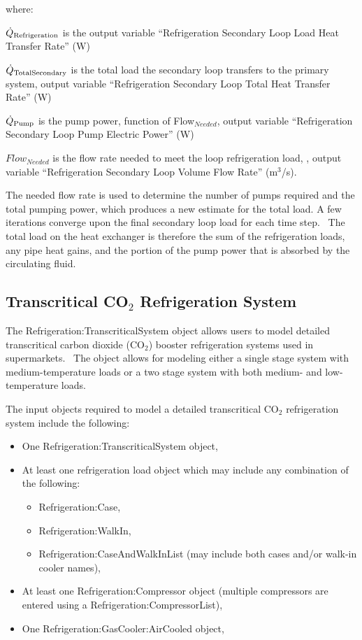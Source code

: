 where:

\({\dot Q_{{\rm{Refrigeration}}}}\) is the output variable ``Refrigeration Secondary Loop Load Heat Transfer Rate'' (W)

\({\dot Q_{{\rm{TotalSecondary}}}}\) is the total load the secondary loop transfers to the primary system, output variable ``Refrigeration Secondary Loop Total Heat Transfer Rate'' (W)

\({\dot Q_{{\rm{Pump}}}}\) is the pump power, function of Flow\(_{Needed}\), output variable ``Refrigeration Secondary Loop Pump Electric Power'' (W)

\(Flow_{Needed}\) is the flow rate needed to meet the loop refrigeration load, , output variable ``Refrigeration Secondary Loop Volume Flow Rate'' (m\(^3\)/s).

The needed flow rate is used to determine the number of pumps required and the total pumping power, which produces a new estimate for the total load. A few iterations converge upon the final secondary loop load for each time step.~ The total load on the heat exchanger is therefore the sum of the refrigeration loads, any pipe heat gains, and the portion of the pump power that is absorbed by the circulating fluid.

\subsection{Transcritical CO\texorpdfstring{\(_{2}\)}{2} Refrigeration System}\label{transcritical-co2-refrigeration-system}

The Refrigeration:TranscriticalSystem object allows users to model detailed transcritical carbon dioxide (CO\(_{2}\)) booster refrigeration systems used in supermarkets.~ The object allows for modeling either a single stage system with medium-temperature loads or a two stage system with both medium- and low-temperature loads.

The input objects required to model a detailed transcritical CO\(_{2}\) refrigeration system include the following:

\begin{itemize}
  \item One Refrigeration:TranscriticalSystem object,
  \item At least one refrigeration load object which may include any combination of the following:
  \begin{itemize}
    \item Refrigeration:Case,
    \item Refrigeration:WalkIn,
    \item Refrigeration:CaseAndWalkInList (may include both cases and/or walk-in cooler names),
  \end{itemize}
  \item At least one Refrigeration:Compressor object (multiple compressors are entered using a Refrigeration:CompressorList),
  \item One Refrigeration:GasCooler:AirCooled object,
\end{itemize}

